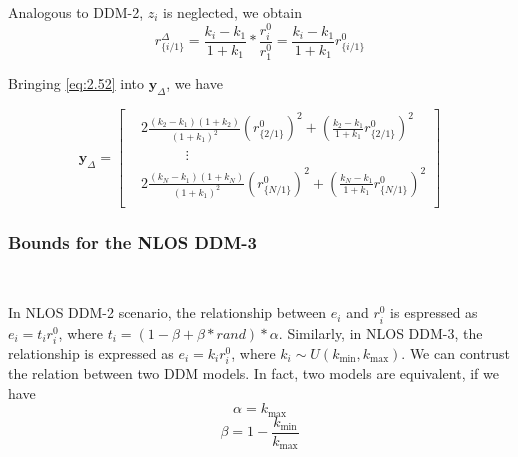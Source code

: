 \documentclass[journal]{IEEEtran}
\begin{document}
Analogous to DDM-2, $z_i$ is neglected, we obtain
\begin{equation}\label{eq:2.52}
{{r}_{\{i/1\}}^{\Delta}} = \frac{{k_i}-{k_1}}{1+{k_1}} * \frac{{r_{i}^{0}}}{{r_{1}^{0}}}
= \frac{{k_i}-{k_1}}{1+{k_1}}{{r}_{\{i/1\}}^{0}}
\end{equation}

Bringing \eqref{eq:2.52} into $\mathbf{y}_{\Delta}$, we have
\begin{small}
\begin{equation}\label{eq:2.521}
 \mathbf{y}_{\Delta}\!=\!\begin{bmatrix}
  &2\frac{{\left({k_2}\!-\!{k_1}\right)\left({1\!+\!{k_2}}\right)}}{{\left(1\!+\!{k_1}\right)}^2}\left({{r}_{\{2/1\}}^{0}}\right)^2
  \!+\!\left({\frac{{k_2}\!-\!{k_1}}{1\!+\!{k_1}}{{r}_{\{2/1\}}^{0}}}\right)^2\\
 & \begin{matrix}
   {} & {}  \\
\end{matrix}\begin{matrix}
   {}  \\
\end{matrix}\begin{matrix}
   {}  \\
\end{matrix}\vdots  \\
 &2\frac{{\left({k_N}\!-\!{k_1}\right)\left({1\!+\!{k_N}}\right)}}{{\left(1\!+\!{k_1}\right)}^2}\left({{r}_{\{N/1\}}^{0}}\right)^2
  \!+\!\left({\frac{{k_N}\!-\!{k_1}}{1\!+\!{k_1}}{{r}_{\{N/1\}}^{0}}}\right)^2 \\
\end{bmatrix}
\end{equation}
\end{small}
\subsubsection{Bounds for the NLOS DDM-3}
\


In NLOS DDM-2 scenario, the relationship between $e_i$ and ${r_{i}^{0}}$ is espressed as $e_i = {t_i}{r_{i}^{0}}$, where $t_i = (1 - \beta + \beta * rand) * \alpha $. Similarly, in NLOS DDM-3, the relationship is expressed as ${e_i} = {k_i}{r_{i}^{0}}$, where ${k_i} \sim U({k_{\min}},{k_{\max}})$. We can contrust the relation between two DDM models. In fact, two models are equivalent, if we have
\begin{equation}\label{eq:2.53}
 \alpha = k_{\max}
\end{equation}
\begin{equation}\label{eq:2.54}
   \beta = 1 - \frac{k_{\min}}{k_{\max}}
  \end{equation}
\end{document}
